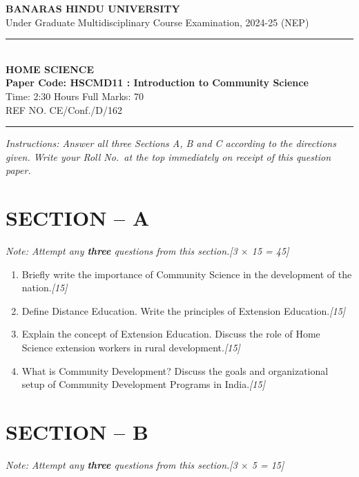 \documentclass[11pt,a4paper]{article}
\newcommand{\pts}[1]{\hfill \textit{[#1]}}
\begin{document}
\begin{center}
  {\large\bfseries BANARAS HINDU UNIVERSITY}\\[2pt]
  {\normalsize Under Graduate Multidisciplinary Course Examination, 2024-25 (NEP)}\\[6pt]
  \rule{0.8\linewidth}{0.5pt}\\[6pt]
  {\large\bfseries HOME SCIENCE}\\[4pt]
  {\large\bfseries Paper Code: HSCMD11 : Introduction to Community Science}\\[4pt]
  {\normalsize Time: 2:30 Hours \hfill Full Marks: 70}\\[2pt]
  {\small REF NO. CE/Conf./D/162}
\end{center}
\rule{\linewidth}{0.4pt}
\smallskip

\noindent \textit{Instructions: Answer all three Sections A, B and C according to the directions given. Write your Roll No.\ at the top immediately on receipt of this question paper.}

\bigskip

\section*{SECTION -- A}
\noindent \textit{Note: Attempt any \textbf{three} questions from this section.}\pts{3 $\times$ 15 = 45}

\begin{enumerate}[label=\textbf{\arabic*.},leftmargin=*,itemsep=10pt]

  \item Briefly write the importance of Community Science in the development of the nation.\pts{15}

  \item Define Distance Education. Write the principles of Extension Education.\pts{15}

  \item Explain the concept of Extension Education. Discuss the role of Home Science extension workers in rural development.\pts{15}

  \item What is Community Development? Discuss the goals and organizational setup of Community Development Programs in India.\pts{15}

\end{enumerate}

\bigskip

\section*{SECTION -- B}
\noindent \textit{Note: Attempt any \textbf{three} questions from this section.}\pts{3 $\times$ 5 = 15}
\end{document}
